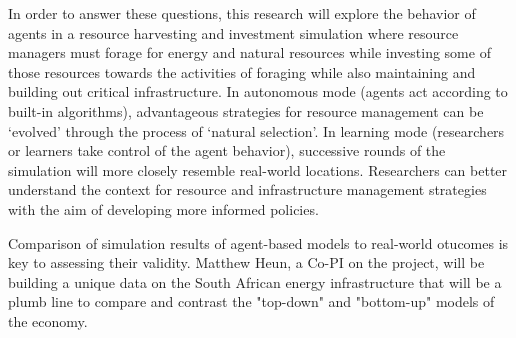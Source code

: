 \documentclass[11pt,a4paper]{article}
\begin{document}
In order to answer these questions,
this research will explore the behavior of agents in 
a resource harvesting and investment simulation where 
resource managers must forage for energy and natural resources 
while investing some of those resources towards the activities of foraging 
while also maintaining and building out critical infrastructure. 
In autonomous mode (agents act according to built-in algorithms), 
advantageous strategies for resource management can be 
`evolved' through the process of `natural selection'. 
In learning mode (researchers or learners take control of the agent behavior), 
successive rounds of the simulation will more closely resemble real-world locations. 
Researchers can better understand the context for 
resource and infrastructure management strategies 
with the aim of developing more informed policies.

Comparison of simulation results of agent-based models to real-world otucomes 
is key to assessing their validity. Matthew Heun, 
a Co-PI on the project, will be building a unique data on the South African energy infrastructure 
that will be a plumb line to compare and contrast the "top-down" and "bottom-up" models of the economy.




\newpage





\end{document}
